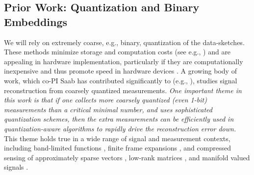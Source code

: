\subsection{Prior Work: Quantization and Binary Embeddings}\label{sec:quant}
We will rely on extremely
coarse, e.g., binary, quantization of the data-sketches. These methods minimize storage and computation costs (see e.g., \cite{fang2014sparse,boufounos20081}) and 
are appealing in hardware implementation, particularly if they are computationally inexpensive and thus promote speed in hardware devices  \cite{jacques2013robust,le2005analog}. A growing body of work, which co-PI Saab has contributed significantly to (e.g., \cite{SaabIEEEIT,knudson2016one,saab2018quantization,LybrandSaab2018,iwen2019new, daubechies2015deterministic}), studies signal reconstruction from coarsely quantized measurements. \emph{One important theme in this work is that if one collects more coarsely quantized (even 1-bit) measurements  than a critical minimal number, and uses sophisticated quantization schemes, then the extra measurements can be efficiently used in quantization-aware algorithms to rapidly drive the reconstruction error down.}%
This theme holds true in a wide range of signal and measurement contexts, including band-limited functions \cite{daubechies2015deterministic}, finite frame expansions \cite{iwen2013near},  and compressed sensing of approximately sparse vectors \cite{SaabIEEEIT, saab2018quantization}, low-rank matrices \cite{LybrandSaab2018}, and manifold valued signals \cite{iwen2019new}.

